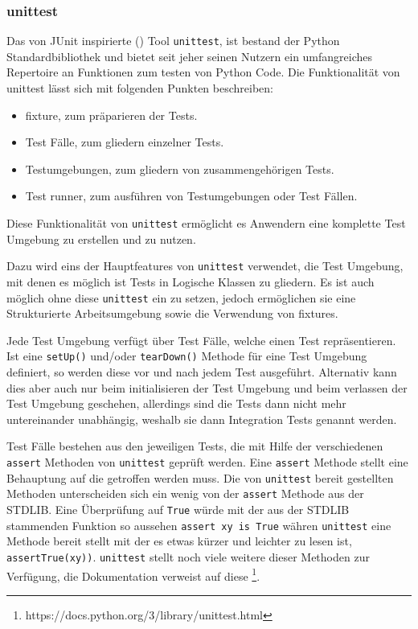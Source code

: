 \subsubsection{unittest}\label{python-tools:unittest}

Das von JUnit inspirierte (\cite{docs.python:unittest}) Tool
\lstinline{unittest}, ist bestand der Python Standardbibliothek und bietet seit
jeher seinen Nutzern ein umfangreiches Repertoire an Funktionen zum testen von
Python Code.
\noindent
Die Funktionalität von unittest lässt sich mit folgenden Punkten beschreiben:
\begin{itemize}
    \item \Gls{fixture}, zum präparieren der Tests.
    \item Test Fälle, zum gliedern einzelner Tests.
    \item Testumgebungen, zum gliedern von zusammengehörigen Tests.
    \item Test runner, zum ausführen von Testumgebungen oder Test Fällen.
\end{itemize}
\noindent
Diese Funktionalität von \lstinline{unittest} ermöglicht es Anwendern eine
komplette Test Umgebung zu erstellen und zu nutzen.

Dazu wird eins der Hauptfeatures von \lstinline{unittest} verwendet, die Test
Umgebung, mit denen es möglich ist Tests in Logische Klassen zu gliedern. Es ist
auch möglich ohne diese \lstinline{unittest} ein zu setzen, jedoch ermöglichen
sie eine Strukturierte Arbeitsumgebung sowie die Verwendung von \Glspl{fixture}.

Jede Test Umgebung verfügt über Test Fälle, welche einen Test repräsentieren.
Ist eine \lstinline{setUp()} und/oder \lstinline{tearDown()} Methode für eine
Test Umgebung definiert, so werden diese vor und nach jedem Test ausgeführt.
Alternativ kann dies aber auch nur beim initialisieren der Test Umgebung und
beim verlassen der Test Umgebung geschehen, allerdings sind die Tests dann nicht
mehr untereinander unabhängig, weshalb sie dann Integration Tests genannt
werden.

Test Fälle bestehen aus den jeweiligen Tests, die mit Hilfe der verschiedenen
\lstinline{assert} Methoden von \lstinline{unittest} geprüft werden. Eine
\lstinline{assert} Methode stellt eine Behauptung auf die getroffen werden muss.
Die von \lstinline{unittest} bereit gestellten Methoden unterscheiden sich ein
wenig von der \lstinline{assert} Methode aus der STDLIB. Eine Überprüfung auf
\lstinline{True} würde mit der aus der STDLIB stammenden Funktion so aussehen
\lstinline{assert xy is True} währen \lstinline{unittest} eine Methode bereit
stellt mit der es etwas kürzer und leichter zu lesen ist,
\lstinline{assertTrue(xy))}. \lstinline{unittest} stellt noch viele weitere
dieser Methoden zur Verfügung, die Dokumentation verweist auf diese
\footnote{https://docs.python.org/3/library/unittest.html}.

